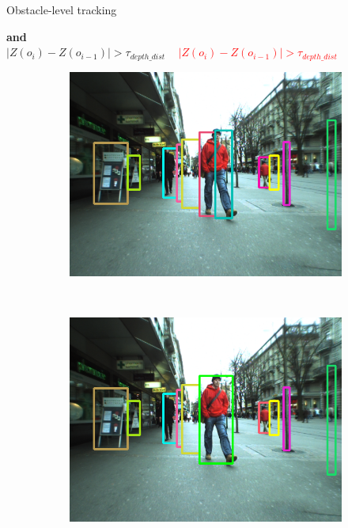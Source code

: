 \begin{frame}[plain]{Obstacle-level tracking}
\begin{overlayarea}{\textwidth}{\textheight}
{\begin{algorithm}[H]
\begin{algorithmic}[1]
{	    \textbf{and}\\ \indent\indent\indent	
	\only<4> {
	      $|Z(o_i) - Z(o_{i-1})| > \tau_{depth\_dist}$ \indent\indent~
	}
	\only<5> {
	      \textcolor{red}{$|Z(o_i) - Z(o_{i-1})| > \tau_{depth\_dist}$} \indent\indent~
	}
	}
	  \EndIf
	\EndFor
      \EndFunction
      \end{algorithmic}
      \end{algorithm}
      \vskip-1.0cm
      \begin{figure}[t]
	\centering
	\begin{subfigure}[t]{0.5\textwidth}
	  \begin{center}
	    \includegraphics[height=0.4\textheight]{obstaclesBeforeAggregation}
	  \end{center}
	\end{subfigure}%
	~
	\begin{subfigure}[t]{0.5\textwidth}
	  \begin{center}
	    \includegraphics[height=0.4\textheight]{obstaclesAggregated}

\end{center}
\end{subfigure}
\end{figure}}
\end{overlayarea}
\end{frame}
